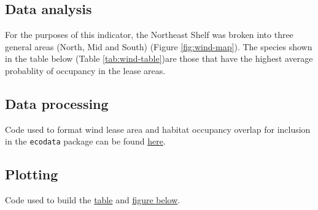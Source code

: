\documentclass[
]{book}
\begin{document}
\hypertarget{data-analysis-43}{%
\subsection{Data analysis}\label{data-analysis-43}}

For the purposes of this indicator, the Northeast Shelf was broken into three general areas (North, Mid and South) (Figure \ref{fig:wind-map}). The species shown in the table below (Table \ref{tab:wind-table})are those that have the highest average probablity of occupancy in the lease areas.

\hypertarget{data-processing-30}{%
\subsection{Data processing}\label{data-processing-30}}

Code used to format wind lease area and habitat occupancy overlap for inclusion in the \texttt{ecodata} package can be found \href{https://github.com/NOAA-EDAB/ecodata/blob/master/data-raw/get_wind_occupancy.R}{here}.

\hypertarget{plotting-36}{%
\subsection{Plotting}\label{plotting-36}}

Code used to build the \href{https://github.com/NOAA-EDAB/ecodata/blob/master/chunk-scripts/human_dimensions.Rmd-wind_habitat_table.R}{table} and \href{https://github.com/NOAA-EDAB/ecodata/blob/master/chunk-scripts/human_dimensions.Rmd-eval\%20\%3D\%20T.R}{figure below}.
\end{document}
